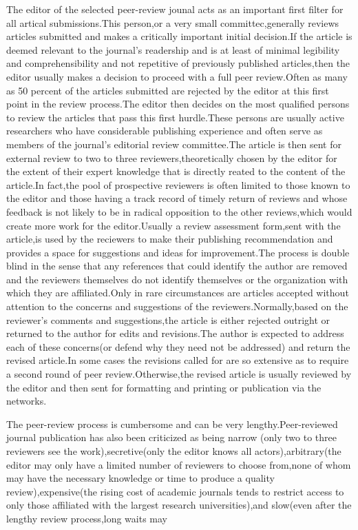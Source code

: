 \documentclass[10pt,a4paper]{book}
\begin{document}
The editor of the selected peer-review jounal acts as an important first filter for all artical submissions.This person,or a very small committec,generally reviews articles submitted and makes a critically important initial decision.If the article is deemed relevant to the journal's readership and is at least of minimal legibility and comprehensibility and not repetitive of previously published articles,then the editor usually makes a decision to proceed with a full peer review.Often as many as 50 percent of the articles submitted are rejected by the editor at this first point in the review process.The editor then decides on the most qualified persons to review the articles that pass this first hurdle.These persons are usually active researchers who have considerable publishing experience and often serve as members of the journal's editorial review committee.The article is then sent for external review to two to three reviewers,theoretically chosen by the editor for the extent of their expert knowledge that is directly reated to the content of the article.In fact,the pool of prospective reviewers is often limited to those known to the editor and those having a track record of timely return of reviews and whose feedback is not likely to be in radical opposition to the other reviews,which would create more work for the editor.Usually a review assessment form,sent with the article,is used by the reciewers to make their publishing recommendation and provides a space for suggestions and ideas for improvement.The process is double blind in the sense that any references that could identify the author are removed and the reviewers themselves do not identify themselves or the organization with which they are affiliated.Only in rare circumstances are articles accepted without attention to the concerns and suggestions of the reviewers.Normally,based on the reviewer's comments and suggestions,the article is either rejected outright or returned to the author for edits and revisions.The author is expected to address each of these concerns(or defend why they need not be addressed) and return the revised article.In some cases the revisions called for are so extensive as to require a second round of peer review.Otherwise,the revised article is usually reviewed by the editor and then sent for formatting and printing or publication via the networks.

The peer-review process is cumbersome and can be very lengthy.Peer-reviewed journal publication has also been criticized as being narrow (only two to three reviewers see the work),secretive(only the editor knows all actors),arbitrary(the editor may only have a limited number of reviewers to choose from,none of whom may have the necessary knowledge or time to produce a quality review),expensive(the rising cost of academic journals tends to restrict access to only those affiliated with the largest research universities),and slow(even after the lengthy review process,long waits may
\end{document}
